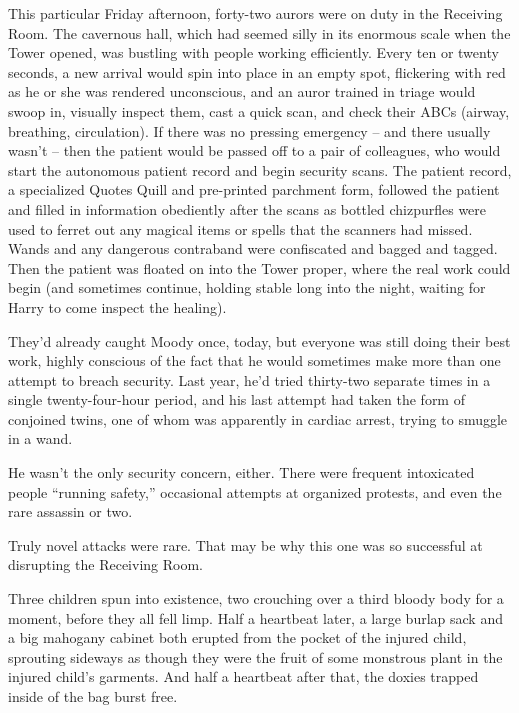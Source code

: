 This particular Friday afternoon, forty-two aurors were on duty in the
Receiving Room. The cavernous hall, which had seemed silly in its
enormous scale when the Tower opened, was bustling with people working
efficiently. Every ten or twenty seconds, a new arrival would spin into
place in an empty spot, flickering with red as he or she was rendered
unconscious, and an auror trained in triage would swoop in, visually
inspect them, cast a quick scan, and check their ABCs (airway,
breathing, circulation). If there was no pressing emergency -- and there
usually wasn't -- then the patient would be passed off to a pair of
colleagues, who would start the autonomous patient record and begin
security scans. The patient record, a specialized Quotes Quill and
pre-printed parchment form, followed the patient and filled in
information obediently after the scans as bottled chizpurfles were used
to ferret out any magical items or spells that the scanners had missed.
Wands and any dangerous contraband were confiscated and bagged and
tagged. Then the patient was floated on into the Tower proper, where the
real work could begin (and sometimes continue, holding stable long into
the night, waiting for Harry to come inspect the healing).

They'd already caught Moody once, today, but everyone was still doing
their best work, highly conscious of the fact that he would sometimes
make more than one attempt to breach security. Last year, he'd tried
thirty-two separate times in a single twenty-four-hour period, and his
last attempt had taken the form of conjoined twins, one of whom was
apparently in cardiac arrest, trying to smuggle in a wand.

He wasn't the only security concern, either. There were frequent
intoxicated people ``running safety,'' occasional attempts at organized
protests, and even the rare assassin or two.

Truly novel attacks were rare. That may be why this one was so
successful at disrupting the Receiving Room.

Three children spun into existence, two crouching over a third bloody
body for a moment, before they all fell limp. Half a heartbeat later, a
large burlap sack and a big mahogany cabinet both erupted from the
pocket of the injured child, sprouting sideways as though they were the
fruit of some monstrous plant in the injured child's garments. And half
a heartbeat after that, the doxies trapped inside of the bag burst free.

